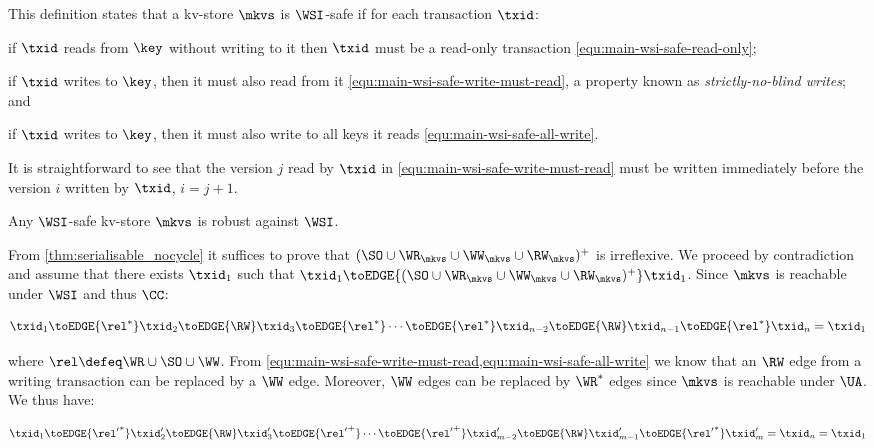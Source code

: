 This definition states that a kv-store $\mkvs$ is \(\WSI\)-safe if for each transaction $\txid$: 
\begin{enumerate*} 
    \item if $\txid$ reads from $\key$ without writing to it then $\txid$ must be a read-only transaction \eqref{equ:main-wsi-safe-read-only}; 
    \item if \( \txid \) writes to $\key$, then it must also read from it \eqref{equ:main-wsi-safe-write-must-read}, a property known as \emph{strictly-no-blind writes}; and
	\item  if \( \txid \) writes to $\key$, then it must also write to all keys it reads \eqref{equ:main-wsi-safe-all-write}.
\end{enumerate*}
It is straightforward to see that the version $j$ read by \( \txid \) in \eqref{equ:main-wsi-safe-write-must-read} must be written immediately before the version $i$ written by \( \txid \), \ie \( i {=} j + 1 \).

\spaceshrink{-5pt}
\begin{theorem}
 \label{thm:main-wsi-robust}
    Any \(\WSI\)-safe kv-store \( \mkvs \) is robust against \(\WSI\).   
\end{theorem}
\spaceshrink{-5pt}

\noindent From \cref{thm:serialisable_nocycle} it suffices to prove that $(\SO \cup \WR_{\mkvs} \cup \WW_{\mkvs} \cup \RW_{\mkvs})^{+}$ is irreflexive.
We proceed by contradiction and assume that there exists $\txid_1$ such that $\txid_1 \toEDGE{(\SO \cup \WR_{\mkvs} \cup \WW_{\mkvs} \cup \RW_{\mkvs})^{+}} \txid_1$. 
Since \( \mkvs \) is reachable under \( \WSI \) and thus \( \CC \):%

\spaceshrink{-5pt}
{\displaymathfont
\[
    \txid_1 \toEDGE{\rel^*} \txid_2 \toEDGE{\RW} \txid_3 \toEDGE{\rel^*} \cdots \toEDGE{\rel^*} \txid_{n-2} \toEDGE{\RW} \txid_{n-1} \toEDGE{\rel^*} \txid_n = \txid_1
\]
\normalsize}%
\spaceshrink{-10pt}
 
\noindent{}where \( \rel \defeq \WR \cup \SO \cup \WW \).
From \cref{equ:main-wsi-safe-write-must-read,equ:main-wsi-safe-all-write} we know that 
an \( \RW \) edge from a writing transaction can be replaced by a \( \WW \) edge.
Moreover, \( \WW \) edges can be replaced by \( \WR^* \) edges since \( \mkvs \) is reachable under \( \UA \).
We thus have:

\spaceshrink{-5pt}
{\displaymathfont
\[
    \txid_1 \toEDGE{{\rel'}^*} \txid'_2 \toEDGE{\RW} \txid'_3 \toEDGE{{\rel'}^+} \cdots \toEDGE{{\rel'}^+} \txid'_{m-2} \toEDGE{\RW} \txid'_{m-1} \toEDGE{{\rel'}^*} \txid'_m = \txid_n = \txid_1
\]
\normalsize}
\spaceshrink{-10pt}


